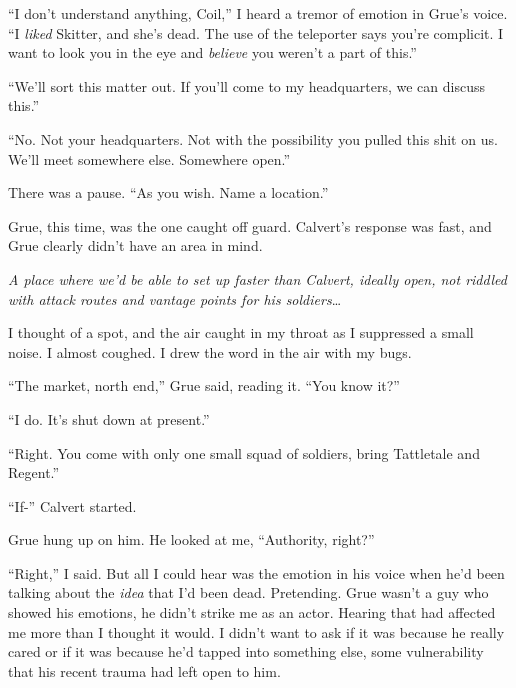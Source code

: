 ``I don't understand anything, Coil,'' I heard a tremor of emotion in Grue's voice.  ``I \emph{liked} Skitter, and she's dead.  The use of the teleporter says you're complicit.  I want to look you in the eye and \emph{believe }you weren't a part of this.''



``We'll sort this matter out.  If you'll come to my headquarters, we can discuss this.''



``No.  Not your headquarters.  Not with the possibility you pulled this shit on us.  We'll meet somewhere else.  Somewhere open.''



There was a pause.  ``As you wish.  Name a location.''



Grue, this time, was the one caught off guard.  Calvert's response was fast, and Grue clearly didn't have an area in mind.



\emph{A place where we'd be able to set up faster than Calvert, ideally open, not riddled with attack routes and vantage points for his soldiers}\ldots



I thought of a spot, and the air caught in my throat as I suppressed a small noise.  I almost coughed.  I drew the word in the air with my bugs.



``The market, north end,'' Grue said, reading it.  ``You know it?''



``I do.  It's shut down at present.''



``Right.  You come with only one small squad of soldiers, bring Tattletale and Regent.''



``If-''  Calvert started.



Grue hung up on him.  He looked at me, ``Authority, right?''



``Right,'' I said.  But all I could hear was the emotion in his voice when he'd been talking about the \emph{idea} that I'd been dead.  Pretending.  Grue wasn't a guy who showed his emotions, he didn't strike me as an actor.  Hearing that had affected me more than I thought it would.  I didn't want to ask if it was because he really cared or if it was because he'd tapped into something else, some vulnerability that his recent trauma had left open to him.



